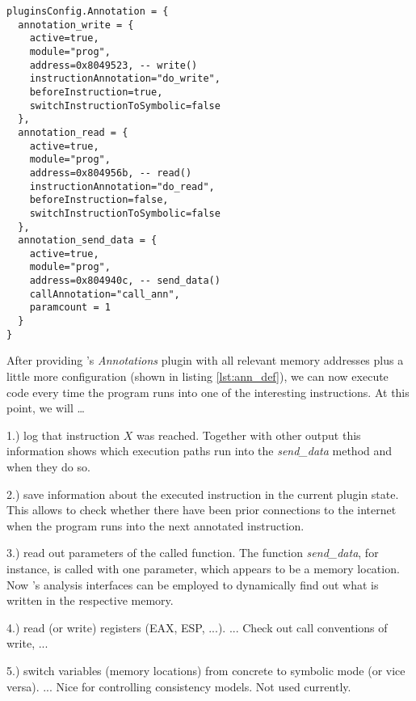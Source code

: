 \bigskip
\begin{lstlisting}[language={[5.0]Lua}, basicstyle=\ttfamily\footnotesize, caption={Configuration of the \textit{Annotations} plugin (part). Defines the instructions to be monitored and actions to trigger upon execution of these instructions.}, label={lst:ann_def}]
pluginsConfig.Annotation = {
  annotation_write = {
    active=true,
    module="prog",
    address=0x8049523, -- write()
    instructionAnnotation="do_write",
    beforeInstruction=true,
    switchInstructionToSymbolic=false
  },
  annotation_read = {
    active=true,
    module="prog",
    address=0x804956b, -- read()
    instructionAnnotation="do_read",
    beforeInstruction=false, 
    switchInstructionToSymbolic=false
  },
  annotation_send_data = {
    active=true,
    module="prog",
    address=0x804940c, -- send_data()
    callAnnotation="call_ann",
    paramcount = 1
  }
}
\end{lstlisting}
\bigskip


After providing \sse's \textit{Annotations} plugin with all relevant memory addresses plus a little more configuration (shown in listing \ref{lst:ann_def}), we can now execute code every time the program runs into one of the interesting instructions.
At this point, we will \ldots

1.) log that instruction $X$ was reached.
Together with other \sse output this information shows which execution paths run into the \textit{send\_data} method and when they do so.

2.) save information about the executed instruction in the current plugin state.
This allows to check whether there have been prior connections to the internet when the program runs into the next annotated instruction.

3.) read out parameters of the called function.
The function \textit{send\_data}, for instance, is called with one parameter, which appears to be a memory location.
Now \sse's analysis interfaces can be employed to dynamically find out what is written in the respective memory.

4.) read (or write) registers (EAX, ESP, ...).
... Check out call conventions of write, ...

5.) switch variables (memory locations) from concrete to symbolic mode (or vice versa).
... Nice for controlling consistency models. Not used currently.

\bigskip

